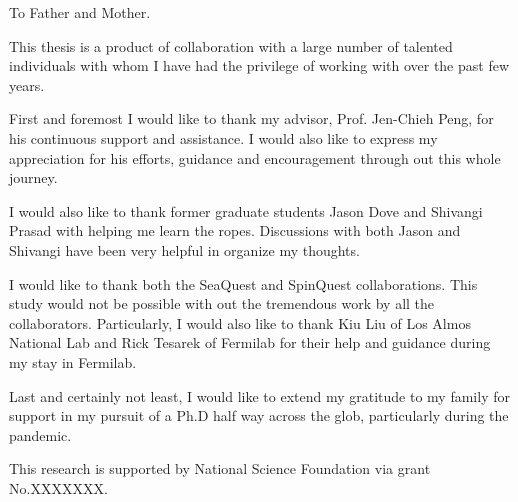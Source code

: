 \documentclass[../main.tex]{subfiles}
\begin{document}
\begin{dedication}
	To Father and Mother.
\end{dedication}

\begin{acknowledgments}
	This thesis is a product of collaboration with a large number of talented
	individuals with whom I have had the privilege of working with over the past
	few years.

	First and foremost I would like to thank my advisor, Prof. Jen-Chieh Peng, for
	his continuous support and assistance. I would also like to express my
	appreciation for his efforts, guidance and encouragement through out this whole
	journey.

	I would also like to thank former graduate students Jason Dove and Shivangi
	Prasad with helping me learn the ropes. Discussions with both Jason and
	Shivangi have been very helpful in organize my thoughts.

	I would like to thank both the SeaQuest and SpinQuest collaborations.
	This study would not be possible with out the tremendous work by all the
	collaborators. Particularly, I would also like to thank Kiu Liu of Los Almos
	National Lab and Rick Tesarek of Fermilab for their help and guidance during my
	stay in Fermilab.

	Last and certainly not least, I would like to extend my gratitude to my family 
	for support in my 	pursuit of a Ph.D half way across the glob, particularly 
	during the pandemic.

	This research is supported by National Science Foundation via grant No.XXXXXXX.

\end{acknowledgments}
\end{document}
